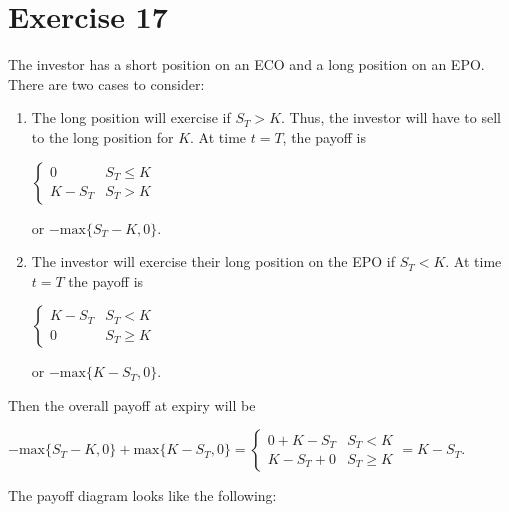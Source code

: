 \documentclass{article}
\begin{document}
\section*{Exercise 17}
The investor has a short position on an ECO and a long position on an EPO. There are two cases to consider:
\begin{enumerate}
    \item The long position will exercise if $S_T > K$. Thus, the investor will have to sell to the long position for $K$. At time $t=T$, the payoff is
    
    $\begin{cases}
        0 & S_T \leq K \\
        K - S_T & S_T > K
    \end{cases}$

    or $-\text{max}\{S_T-K, 0\}$.

    \item The investor will exercise their long position on the EPO if $S_T < K$. At time $t=T$ the payoff is
    
    $\begin{cases}
        K-S_T & S_T < K \\
        0 & S_T \geq K
    \end{cases}$

    or $-\text{max}\{K-S_T, 0\}$.
\end{enumerate}
Then the overall payoff at expiry will be 
\begin{center}
    $-\text{max}\{S_T-K, 0\} + \text{max}\{K-S_T, 0\} = 
    \begin{cases}
        0 + K - S_T & S_T < K \\
        K - S_T + 0 & S_T \geq K
    \end{cases}
    = K - S_T$.
\end{center}
The payoff diagram looks like the following: 
\begin{center}
\end{center}
\end{document}
